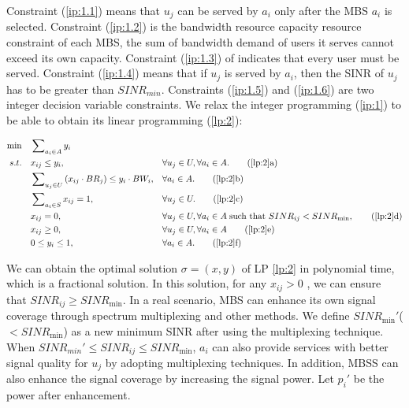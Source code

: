 \documentclass[11pt,a4paper]{article}
\begin{document}
Constraint (\ref{ip:1.1}) means that $u_j$ can be served by $a_i$ only after the MBS $a_i$ is selected. Constraint (\ref{ip:1.2}) is the bandwidth resource capacity resource constraint of each MBS, the sum of bandwidth demand of users it serves cannot exceed its own capacity. Constraint (\ref{ip:1.3}) of indicates that every user must be served. Constraint (\ref{ip:1.4}) means that if $u_j$ is served by $a_i$, then the SINR of $u_j$ has to be greater than $SINR_{min}$. Constraints (\ref{ip:1.5}) and (\ref{ip:1.6}) are two integer decision variable constraints. We relax the integer programming (\ref{ip:1}) to be able to obtain its linear programming (\ref{lp:2}):

\begin{align}
	\min \quad & \sum\nolimits_{{a_i} \in A} {{y_i}}&&  \label{lp:2}\\
	s.t.\quad &  {x_{ij}} \le {y_i},&&\forall {u_j} \in U,\forall {a_i} \in A. \tag{\ref{lp:2}{a}}\label{lp:2.1}\\
	&  \sum\nolimits_{{u_j} \in U} {({x_{ij}} \cdot B{R_j})}  \le {y_i} \cdot B{W_i},&&\forall {a_i} \in A. \tag{\ref{lp:2}{b}}\label{lp:2.2}\\
	&  \sum\nolimits_{{a_i} \in S} {{x_{ij}}}  = 1,&&\forall {u_j} \in U. \tag{\ref{lp:2}{c}}\label{lp:2.3}\\
	&  {x_{ij}} = 0,&&\forall {u_j} \in U,\forall {a_i} \in A\;{\text{such that }}SIN{R_{ij}} < SIN{R_{\min }}, \tag{\ref{lp:2}{d}}\label{lp:2.4}\\
	&  {x_{ij}} \ge 0,&&\forall u_j \in U,\forall {a_i} \in A \tag{\ref{lp:2}{e}}\label{lp:2.5}\\
	&  0 \le {y_i} \le 1,&&\forall {a_i} \in A. \tag{\ref{lp:2}{f}}\label{lp:2.6}
\end{align}

We can obtain the optimal solution $\sigma=(x,y)$ of LP \ref{lp:2} in polynomial time, which is a fractional solution. In this solution, for any $x_{ij}>0$ , we can ensure that $SINR_{ij}\ge SINR_{\min}$. In a real scenario, MBS can enhance its own signal coverage through spectrum multiplexing and other methods. We define $SINR_{\min}'$($<SINR_{\min}$) as a new minimum SINR after using the multiplexing technique. When $SINR_{min}' \le SINR_{ij} \le SINR_{\min}$, $a_i$ can also provide services with better signal quality for $u_j$ by adopting multiplexing techniques. In addition, MBSS can also enhance the signal coverage by increasing the signal power. Let $p_i'$ be the power after enhancement.
\end{document}

